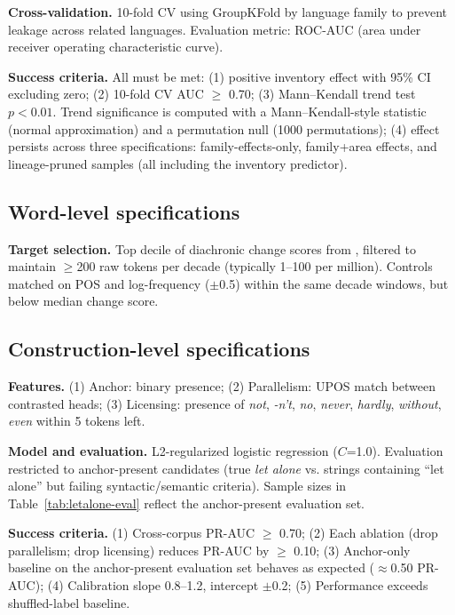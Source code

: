 \documentclass[12pt]{article}
\begin{document}
\textbf{Cross-validation.} 10-fold CV using GroupKFold by language family to prevent leakage across related languages. Evaluation metric: ROC-AUC (area under receiver operating characteristic curve).

\textbf{Success criteria.} All must be met: (1) positive inventory effect with 95\% CI excluding zero; (2) 10-fold CV AUC $\geq$ 0.70; (3) Mann--Kendall trend test $p < 0.01$. Trend significance is computed with a Mann--Kendall-style statistic (normal approximation) and a permutation null (1000 permutations); (4) effect persists across three specifications: family-effects-only, family+area effects, and lineage-pruned samples (all including the inventory predictor).

\subsection{Word-level specifications}

\textbf{Target selection.} Top decile of diachronic change scores from \citet{HamiltonEtAl2016}, filtered to maintain $\geq$200 raw tokens per decade (typically 1--100 per million). Controls matched on POS and log-frequency ($\pm$0.5) within the same decade windows, but below median change score.

\subsection{Construction-level specifications}

\textbf{Features.} (1) Anchor: binary presence; (2) Parallelism: UPOS match between contrasted heads; (3) Licensing: presence of \textit{not}, \textit{-n't}, \textit{no}, \textit{never}, \textit{hardly}, \textit{without}, \textit{even} within 5 tokens left.

\textbf{Model and evaluation.} L2-regularized logistic regression ($C$=1.0). Evaluation restricted to anchor-present candidates (true \textit{let alone} vs. strings containing \enquote{let alone} but failing syntactic/semantic criteria). Sample sizes in Table~\ref{tab:letalone-eval} reflect the anchor-present evaluation set.

\textbf{Success criteria.} (1) Cross-corpus PR-AUC $\geq$ 0.70; (2) Each ablation (drop parallelism; drop licensing) reduces PR-AUC by $\geq$ 0.10; (3) Anchor-only baseline on the anchor-present evaluation set behaves as expected ($\approx$0.50 PR-AUC); (4) Calibration slope 0.8--1.2, intercept $\pm$0.2; (5) Performance exceeds shuffled-label baseline.
\end{document}

